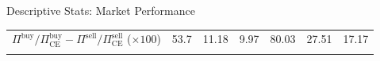 \documentclass[10pt]{beamer}
\begin{document}
\begin{frame}{Descriptive Stats: Market Performance}
\begin{table}[!h]
{\begin{threeparttable}
\begin{tabular}{lccc|ccc}
     ${\Pi^{\text{buy}}}/{\Pi^{\text{buy}}_{\text{CE}}} - {\Pi^{\text{sell}}}/{\Pi^{\text{sell}}_{\text{CE}}}$ 
     ($\times 100$) & 53.7      & 11.18    & 9.97    & 80.03     & 27.51    & 17.17    \\
     \\[-1.8ex] 
    \end{tabular}
\end{threeparttable}

   }
\end{table}
\end{frame}
\end{document}
